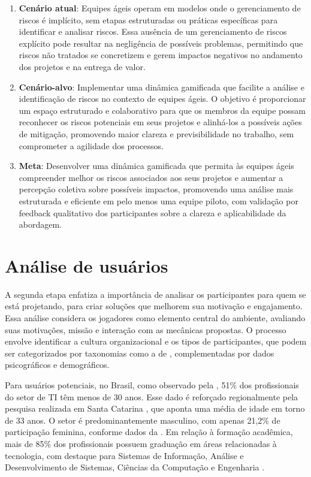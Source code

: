\documentclass[
	12pt,
	openright,
	twoside,
	a4paper,
	english,
	brazil
	]{abntex2}
\begin{document}
\begin{enumerate}
  \item \textbf{Cenário atual}: Equipes ágeis operam em modelos onde o gerenciamento de riscos é implícito, sem etapas estruturadas ou práticas específicas para identificar e analisar riscos. Essa ausência de um gerenciamento de riscos explícito pode resultar na negligência de possíveis problemas, permitindo que riscos não tratados se concretizem e gerem impactos negativos no andamento dos projetos e na entrega de valor.  
  \item \textbf{Cenário-alvo}: Implementar uma dinâmica gamificada que facilite a análise e identificação de riscos no contexto de equipes ágeis. O objetivo é proporcionar um espaço estruturado e colaborativo para que os membros da equipe possam reconhecer os riscos potenciais em seus projetos e alinhá-los a possíveis ações de mitigação, promovendo maior clareza e previsibilidade no trabalho, sem comprometer a agilidade dos processos.  
  \item \textbf{Meta}: Desenvolver uma dinâmica gamificada que permita às equipes ágeis compreender melhor os riscos associados aos seus projetos e aumentar a percepção coletiva sobre possíveis impactos, promovendo uma análise mais estruturada e eficiente em pelo menos uma equipe piloto, com validação por feedback qualitativo dos participantes sobre a clareza e aplicabilidade da abordagem.
\end{enumerate}

\section{Análise de usuários}

A segunda etapa enfatiza a importância de analisar os participantes para quem se está projetando, para criar soluções que melhorem sua motivação e engajamento. Essa análise considera os jogadores como elemento central do ambiente, avaliando suas motivações, missão e interação com as mecânicas propostas. O processo envolve identificar a cultura organizacional e os tipos de participantes, que podem ser categorizados por taxonomias como a de , complementadas por dados psicográficos e demográficos.

Para usuários potenciais, no Brasil, como observado pela , 51\% dos profissionais do setor de TI têm menos de 30 anos. Esse dado é reforçado regionalmente pela pesquisa realizada em Santa Catarina \cite{acate}, que aponta uma média de idade em torno de 33 anos. O setor é predominantemente masculino, com apenas 21,2\% de participação feminina, conforme dados da . Em relação à formação acadêmica, mais de 85\% dos profissionais possuem graduação em áreas relacionadas à tecnologia, com destaque para Sistemas de Informação, Análise e Desenvolvimento de Sistemas, Ciências da Computação e Engenharia \cite{revelo2021tecnologia}.
\end{document}
